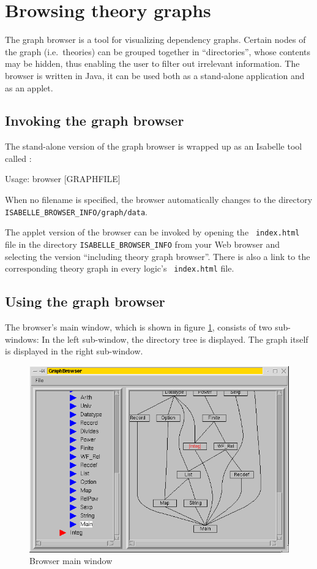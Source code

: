 \section{Browsing theory graphs} \label{sec:browse}

The graph browser is a tool for visualizing dependency graphs. Certain nodes
of the graph (i.e.~theories) can be grouped together in ``directories'', whose
contents may be hidden, thus enabling the user to filter out irrelevant
information.  The browser is written in Java, it can be used both as a
stand-alone application and as an applet.


\subsection{Invoking the graph browser}

The stand-alone version of the graph browser is wrapped up as an
Isabelle tool called :
\begin{ttbox}
Usage: browser [GRAPHFILE]
\end{ttbox}
When no filename is specified, the browser automatically changes to
the directory \texttt{ISABELLE_BROWSER_INFO/graph/data}.

\medskip The applet version of the browser can be invoked by opening the {\tt
  index.html} file in the directory \texttt{ISABELLE_BROWSER_INFO} from your
Web browser and selecting the version ``including theory graph browser''.
There is also a link to the corresponding theory graph in every logic's {\tt
  index.html} file.


\subsection{Using the graph browser}

The browser's main window, which is shown in figure
\ref{browserwindow}, consists of two sub-windows: In the left
sub-window, the directory tree is displayed. The graph itself is
displayed in the right sub-window.
\begin{figure}[ht]
  \includegraphics[width=\textwidth]{browser_screenshot}
  \caption{\label{browserwindow} Browser main window}
\end{figure}


